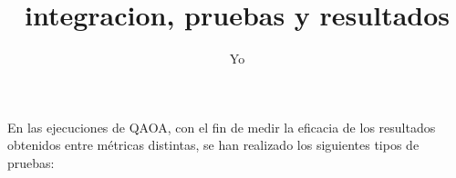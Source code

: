 \documentclass{article}
\title{integracion, pruebas y resultados}
\author{Yo}
\begin{document}
\maketitle{}
\tableofcontents{}

\newpage

En las ejecuciones de QAOA, con el fin de medir la eficacia de los resultados obtenidos entre métricas distintas, se han realizado los siguientes tipos de pruebas:
\end{document}
